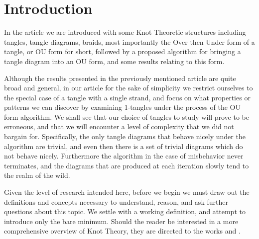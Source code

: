 \section{Introduction}

In the article \citep{barnatan2020tangles} we are introduced with some Knot Theoretic structures including tangles, tangle diagrams, braids, most importantly the Over then Under form of a tangle, or OU form for short, followed by a proposed algorithm for bringing a tangle diagram into an OU form, and some results relating to this form.

Although the results presented in the previously mentioned article are quite broad and general, in our article for the sake of simplicity we restrict ourselves to the special case of a tangle with a single strand, and focus on what properties or patterns we can discover by examining 1-tangles under the process of the OU form algorithm. We shall see that our choice of tangles to study will prove to be erroneous, and that we will encounter a level of complexity that we did not bargain for. Specifically, the only tangle diagrams that behave nicely under the algorithm are trivial, and even then there is a set of trivial diagrams which do not behave nicely. Furthermore the algorithm in the case of misbehavior never terminates, and the diagrams that are produced at each iteration slowly tend to the realm of the wild. 

Given the level of research intended here, before we begin we must draw out the definitions and concepts necessary to understand, reason, and ask further questions about this topic. We settle with a working definition, and attempt to introduce only the bare minimum. Should the reader be interested in a more comprehensive overview of Knot Theory, they are directed to the works \citep{adams_1994} and \citep{lickorish_1997}.


